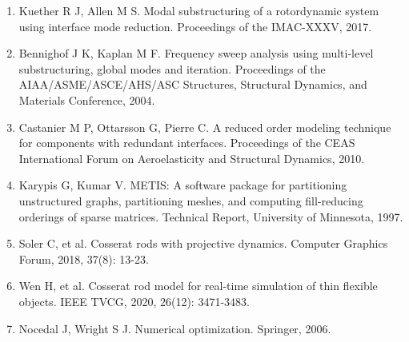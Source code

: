 \begin{enumerate}
  \item Kuether R J, Allen M S. Modal substructuring of a rotordynamic system using interface mode reduction. Proceedings of the IMAC-XXXV, 2017.
  
  \item Bennighof J K, Kaplan M F. Frequency sweep analysis using multi-level substructuring, global modes and iteration. Proceedings of the AIAA/ASME/ASCE/AHS/ASC Structures, Structural Dynamics, and Materials Conference, 2004.
  
  \item Castanier M P, Ottarsson G, Pierre C. A reduced order modeling technique for components with redundant interfaces. Proceedings of the CEAS International Forum on Aeroelasticity and Structural Dynamics, 2010.
  
  \item Karypis G, Kumar V. METIS: A software package for partitioning unstructured graphs, partitioning meshes, and computing fill-reducing orderings of sparse matrices. Technical Report, University of Minnesota, 1997.
  
  \item Soler C, et al. Cosserat rods with projective dynamics. Computer Graphics Forum, 2018, 37(8): 13-23.
  
  \item Wen H, et al. Cosserat rod model for real-time simulation of thin flexible objects. IEEE TVCG, 2020, 26(12): 3471-3483.
  
  \item Nocedal J, Wright S J. Numerical optimization. Springer, 2006.
\end{enumerate}